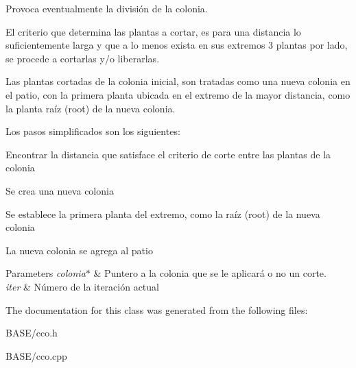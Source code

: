 Provoca eventualmente la división de la colonia. 

El criterio que determina las plantas a cortar, es para una distancia lo suficientemente larga y que a lo menos exista en sus extremos 3 plantas por lado, se procede a cortarlas y/o liberarlas.

Las plantas cortadas de la colonia inicial, son tratadas como una nueva colonia en el patio, con la primera planta ubicada en el extremo de la mayor distancia, como la planta raíz (root) de la nueva colonia.

Los pasos simplificados son los siguientes\+: 
\begin{DoxyItemize}
\item Encontrar la distancia que satisface el criterio de corte entre las plantas de la colonia 
\item Se crea una nueva colonia 
\item Se establece la primera planta del extremo, como la raíz (root) de la nueva colonia 
\item La nueva colonia se agrega al patio 
\end{DoxyItemize}


\begin{DoxyParams}{Parameters}
{\em colonia$\ast$} & Puntero a la colonia que se le aplicará o no un corte. \\
\hline
{\em iter} & Número de la iteración actual \\
\hline
\end{DoxyParams}


The documentation for this class was generated from the following files\+:\begin{DoxyCompactItemize}
\item 
B\+A\+S\+E/cco.\+h\item 
B\+A\+S\+E/cco.\+cpp\end{DoxyCompactItemize}
